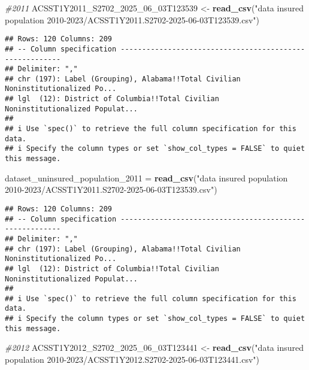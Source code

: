 \documentclass[
]{article}
\newenvironment{Shaded}{\begin{snugshade}}{\end{snugshade}}
\newcommand{\CommentTok}[1]{\textcolor[rgb]{0.56,0.35,0.01}{\textit{#1}}}
\newcommand{\FunctionTok}[1]{\textcolor[rgb]{0.13,0.29,0.53}{\textbf{#1}}}
\newcommand{\NormalTok}[1]{#1}
\newcommand{\OtherTok}[1]{\textcolor[rgb]{0.56,0.35,0.01}{#1}}
\newcommand{\StringTok}[1]{\textcolor[rgb]{0.31,0.60,0.02}{#1}}
\begin{document}
\begin{Shaded}
\begin{Highlighting}[]
\CommentTok{\#2011}
\NormalTok{ACSST1Y2011\_S2702\_2025\_06\_03T123539 }\OtherTok{\textless{}{-}} \FunctionTok{read\_csv}\NormalTok{(}\StringTok{"data insured population 2010{-}2023/ACSST1Y2011.S2702{-}2025{-}06{-}03T123539.csv"}\NormalTok{)}
\end{Highlighting}
\end{Shaded}

\begin{verbatim}
## Rows: 120 Columns: 209
## -- Column specification --------------------------------------------------------
## Delimiter: ","
## chr (197): Label (Grouping), Alabama!!Total Civilian Noninstitutionalized Po...
## lgl  (12): District of Columbia!!Total Civilian Noninstitutionalized Populat...
## 
## i Use `spec()` to retrieve the full column specification for this data.
## i Specify the column types or set `show_col_types = FALSE` to quiet this message.
\end{verbatim}

\begin{Shaded}
\begin{Highlighting}[]
\NormalTok{dataset\_uninsured\_population\_2011 }\OtherTok{=} \FunctionTok{read\_csv}\NormalTok{(}\StringTok{"data insured population 2010{-}2023/ACSST1Y2011.S2702{-}2025{-}06{-}03T123539.csv"}\NormalTok{)}
\end{Highlighting}
\end{Shaded}

\begin{verbatim}
## Rows: 120 Columns: 209
## -- Column specification --------------------------------------------------------
## Delimiter: ","
## chr (197): Label (Grouping), Alabama!!Total Civilian Noninstitutionalized Po...
## lgl  (12): District of Columbia!!Total Civilian Noninstitutionalized Populat...
## 
## i Use `spec()` to retrieve the full column specification for this data.
## i Specify the column types or set `show_col_types = FALSE` to quiet this message.
\end{verbatim}

\begin{Shaded}
\begin{Highlighting}[]
\CommentTok{\#2012}
\NormalTok{ACSST1Y2012\_S2702\_2025\_06\_03T123441 }\OtherTok{\textless{}{-}} \FunctionTok{read\_csv}\NormalTok{(}\StringTok{"data insured population 2010{-}2023/ACSST1Y2012.S2702{-}2025{-}06{-}03T123441.csv"}\NormalTok{)}
\end{Highlighting}
\end{Shaded}
\end{document}
